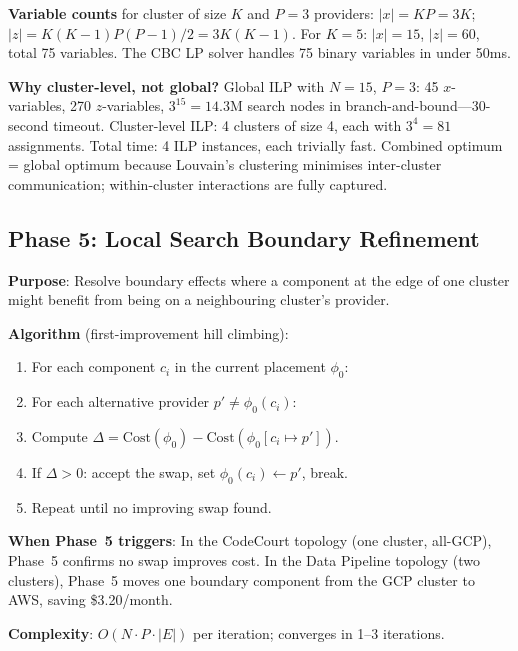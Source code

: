 \documentclass[10pt,journal]{IEEEtran}
\begin{document}
\textbf{Variable counts} for cluster of size $K$ and $P=3$ providers:
$|x| = KP = 3K$; $|z| = K(K-1)P(P-1)/2 = 3K(K-1)$.
For $K=5$: $|x|=15$, $|z|=60$, total 75 variables.
The CBC LP solver handles 75 binary variables in under 50ms.

\textbf{Why cluster-level, not global?}
Global ILP with $N=15$, $P=3$: 45 $x$-variables, 270 $z$-variables,
$3^{15} = 14.3$M search nodes in branch-and-bound---30-second timeout.
Cluster-level ILP: 4 clusters of size 4, each with $3^4=81$ assignments.
Total time: 4 ILP instances, each trivially fast.
Combined optimum = global optimum because Louvain's clustering minimises
inter-cluster communication; within-cluster interactions are fully captured.

\subsection{Phase 5: Local Search Boundary Refinement}

\textbf{Purpose}: Resolve boundary effects where a component at the edge of one
cluster might benefit from being on a neighbouring cluster's provider.

\textbf{Algorithm} (first-improvement hill climbing):
\begin{enumerate}[leftmargin=*,noitemsep]
  \item For each component $c_i$ in the current placement $\phi_0$:
  \item For each alternative provider $p' \neq \phi_0(c_i)$:
  \item Compute $\Delta = \text{Cost}(\phi_0) - \text{Cost}(\phi_0[c_i \mapsto p'])$.
  \item If $\Delta > 0$: accept the swap, set $\phi_0(c_i) \leftarrow p'$, break.
  \item Repeat until no improving swap found.
\end{enumerate}

\textbf{When Phase~5 triggers}:
In the CodeCourt topology (one cluster, all-GCP), Phase~5 confirms no swap
improves cost.
In the Data Pipeline topology (two clusters), Phase~5 moves one boundary
component from the GCP cluster to AWS, saving \$3.20/month.

\textbf{Complexity}: $O(N \cdot P \cdot |E|)$ per iteration; converges in 1--3 iterations.
\end{document}
